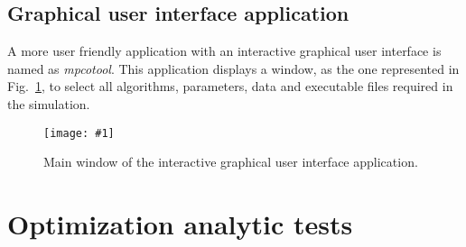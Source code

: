 \documentclass[review,authoryear]{elsarticle}
\newcommand{\FIG}[3]
{
	\begin{figure}[ht!]
		\centering
		\texttt{[image: \#1]}
		\caption{#2.\label{#3}}
	\end{figure}
}
\begin{document}
\subsection{Graphical user interface application}

A more user friendly application with an interactive graphical user interface is
named as \emph{mpcotool}. This application displays a window, as the one
represented in Fig.~\ref{FigWindow}, to select all algorithms,
parameters, data and executable files required in the simulation.
\FIG{mpcotool-en.eps}{Main window of the interactive graphical user interface
application}{FigWindow}

\section{Optimization analytic tests}
\end{document}
